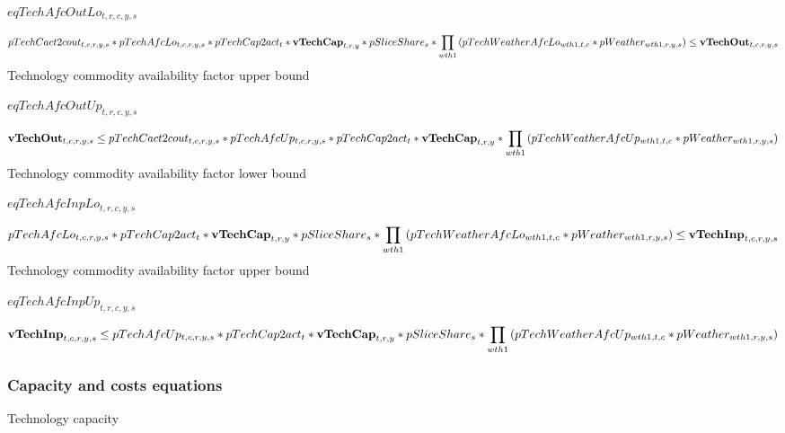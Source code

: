\documentclass{article}
\begin{document}
$eqTechAfcOutLo_{t,r,c,y,s}$





\begin{dmath} 
pTechCact2cout_{t,c,r,y,s}*pTechAfcLo_{t,c,r,y,s}*pTechCap2act_{t}*{\bf vTechCap}_{t,r,y}*pSliceShare_{s}*\prod_{wth1}{\left(pTechWeatherAfcLo_{wth1,t,c}*pWeather_{wth1,r,y,s}\right)}  \le  {\bf vTechOut}_{t,c,r,y,s}
\end{dmath} 
Technology commodity availability factor upper bound







$eqTechAfcOutUp_{t,r,c,y,s}$





\begin{dmath} 
{\bf vTechOut}_{t,c,r,y,s}  \le  pTechCact2cout_{t,c,r,y,s}*pTechAfcUp_{t,c,r,y,s}*pTechCap2act_{t}*{\bf vTechCap}_{t,r,y}*\prod_{wth1}{\left(pTechWeatherAfcUp_{wth1,t,c}*pWeather_{wth1,r,y,s}\right)}
\end{dmath} 
Technology commodity availability factor lower bound







$eqTechAfcInpLo_{t,r,c,y,s}$





\begin{dmath} 
pTechAfcLo_{t,c,r,y,s}*pTechCap2act_{t}*{\bf vTechCap}_{t,r,y}*pSliceShare_{s}*\prod_{wth1}{\left(pTechWeatherAfcLo_{wth1,t,c}*pWeather_{wth1,r,y,s}\right)}  \le  {\bf vTechInp}_{t,c,r,y,s}
\end{dmath} 
Technology commodity availability factor upper bound







$eqTechAfcInpUp_{t,r,c,y,s}$





\begin{dmath} 
{\bf vTechInp}_{t,c,r,y,s}  \le  pTechAfcUp_{t,c,r,y,s}*pTechCap2act_{t}*{\bf vTechCap}_{t,r,y}*pSliceShare_{s}*\prod_{wth1}{\left(pTechWeatherAfcUp_{wth1,t,c}*pWeather_{wth1,r,y,s}\right)}
\end{dmath} 
\subsubsection*{Capacity and costs equations}
Technology capacity
\end{document}
